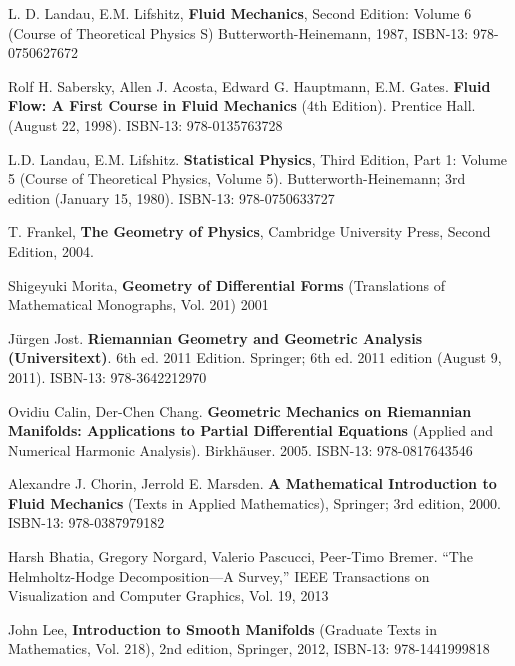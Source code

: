\documentclass[twoside,landscape,10pt]{amsart}
\theoremstyle{plain}
\theoremstyle{definition}
\theoremstyle{remark}
\theoremstyle{remark}
\begin{document}
\begin{thebibliography}{9}

L. D. Landau, E.M. Lifshitz, \textbf{Fluid Mechanics}, Second Edition: Volume 6 (Course of Theoretical Physics S) Butterworth-Heinemann, 1987, ISBN-13: 978-0750627672

Rolf H. Sabersky, Allen J. Acosta, Edward G. Hauptmann, E.M. Gates.  \textbf{Fluid Flow: A First Course in Fluid Mechanics} (4th Edition).  Prentice Hall. (August 22, 1998).  ISBN-13: 978-0135763728

L.D. Landau, E.M. Lifshitz.  \textbf{Statistical Physics}, Third Edition, Part 1: Volume 5 (Course of Theoretical Physics, Volume 5). Butterworth-Heinemann; 3rd edition (January 15, 1980).  ISBN-13: 978-0750633727


T. Frankel,
\textbf{The Geometry of Physics}, 
Cambridge University Press, 
Second Edition,
2004.

Shigeyuki Morita, \textbf{Geometry of Differential Forms} (Translations of Mathematical Monographs, Vol. 201)  2001


J\"{u}rgen Jost. \textbf{Riemannian Geometry and Geometric Analysis (Universitext)}. 6th ed. 2011 Edition.  Springer; 6th ed. 2011 edition (August 9, 2011).  ISBN-13: 978-3642212970


Ovidiu Calin, Der-Chen Chang. \textbf{Geometric Mechanics on Riemannian Manifolds: Applications to Partial Differential Equations} (Applied and Numerical Harmonic Analysis).  Birkh\"{a}user. 2005. ISBN-13: 978-0817643546







Alexandre J. Chorin, Jerrold E. Marsden. \textbf{A Mathematical Introduction to Fluid Mechanics} (Texts in Applied Mathematics), Springer; 3rd edition, 2000. ISBN-13: 978-0387979182


Harsh Bhatia, Gregory Norgard, Valerio Pascucci, Peer-Timo Bremer. ``The Helmholtz-Hodge Decomposition—A Survey,'' IEEE Transactions on Visualization and Computer Graphics, Vol. 19,  2013


John Lee, \textbf{Introduction to Smooth Manifolds} (Graduate Texts in Mathematics, Vol. 218), 2nd edition, Springer,  2012, ISBN-13: 978-1441999818



\end{thebibliography}
\end{document}
